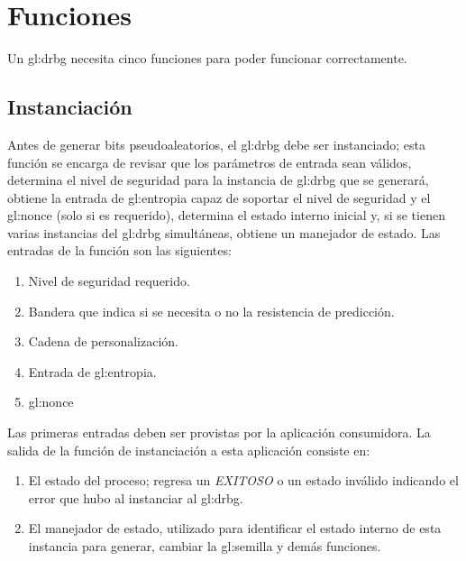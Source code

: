 %
%

\section{Funciones}

Un \gls{gl:drbg} necesita cinco funciones para poder funcionar correctamente.

\subsection{Instanciación}

Antes de generar bits pseudoaleatorios, el \gls{gl:drbg}
debe ser instanciado; esta función se encarga de revisar que los parámetros
de entrada sean válidos, determina  el nivel de seguridad para la instancia
de \gls{gl:drbg} que se generará, obtiene la entrada de \gls{gl:entropia}
capaz de soportar el nivel de seguridad y el \gls{gl:nonce} (solo si es
requerido), determina el estado interno inicial y, si se tienen varias
instancias del \gls{gl:drbg} simultáneas, obtiene un manejador de estado.
Las entradas de la función son las siguientes:

\begin{enumerate}
  \item Nivel de seguridad requerido.
  \item Bandera que indica si se necesita o no la resistencia de predicción.
  \item Cadena de personalización.
  \item Entrada de \gls{gl:entropia}.
  \item \gls{gl:nonce}
\end{enumerate}

Las primeras entradas deben ser provistas por la aplicación consumidora. La
salida de la función de instanciación a esta aplicación consiste en:

\begin{enumerate}
  \item El estado del proceso; regresa un \textit{EXITOSO} o un estado
    inválido indicando el error que hubo al instanciar al \gls{gl:drbg}.
  \item El manejador de estado, utilizado para identificar el estado interno
    de esta instancia para generar, cambiar la \gls{gl:semilla} y demás
    funciones.
\end{enumerate}

